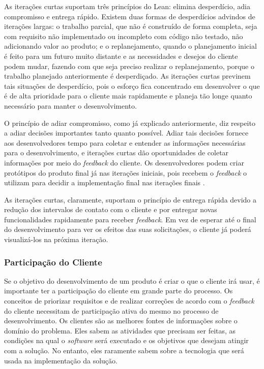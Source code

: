 As iterações curtas suportam três princípios do Lean: elimina desperdício, adia compromisso e entrega rápido. Existem duas formas de desperdícios advindos de iterações largas: o trabalho parcial, que não é construído de forma completa, seja com requisito não implementado ou incompleto com código não testado, não adicionando valor ao produto; e o replanejamento, quando o planejamento inicial é feito para um futuro muito distante e as necessidades e desejos do cliente podem mudar, fazendo com que seja preciso realizar o replanejamento, porque o trabalho planejado anteriormente é desperdiçado. As iterações curtas previnem tais situações de desperdício, pois o esforço fica concentrado em desenvolver o que é de alta prioridade para o cliente mais rapidamente e planeja tão longe quanto necessário para manter o desenvolvimento.  

O princípio de adiar compromisso, como já explicado anteriormente, diz respeito a adiar decisões importantes tanto quanto possível. Adiar tais decisões fornece aos desenvolvedores tempo para coletar e entender as informações necessárias para o desenvolvimento, e iterações curtas dão oportunidades de coletar informações por meio do \textit{feedback} do cliente. Os desenvolvedores podem criar protótipos do produto final já nas iterações iniciais, pois recebem o \textit{feedback} o utilizam para decidir a implementação final nas iterações finais \cite{hibbs2009}.

As iterações curtas, claramente, suportam o princípio de entrega rápida devido a redução dos intervalos de contato com o cliente e por entregar novas funcionalidades rapidamente para receber \textit{feedback}. Em vez de esperar até o final do desenvolvimento para ver os efeitos das suas solicitações, o cliente já poderá visualizá-los na próxima iteração. 

\subsubsection[Participação do Cliente]{Participação do Cliente}

Se o objetivo do desenvolvimento de um produto é criar o que o cliente irá usar, é importante ter a participação do cliente em grande parte do processo. Os conceitos de priorizar requisitos e de realizar correções de acordo com o \textit{feedback} do cliente necessitam de participação ativa do mesmo no processo de desenvolvimento. 
Os clientes são as melhores fontes de informações sobre o domínio do problema. Eles sabem as atividades que precisam ser feitas, as condições na qual o \textit{software} será executado e os objetivos que desejam atingir com a solução. No entanto, eles raramente sabem sobre a tecnologia que será usada na implementação da solução.  


